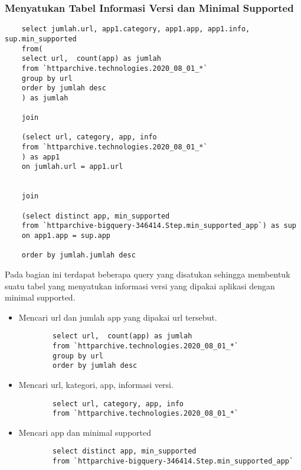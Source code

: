 \subsubsection{Menyatukan Tabel Informasi Versi dan Minimal Supported}
\begin{lstlisting}
	select jumlah.url, app1.category, app1.app, app1.info, sup.min_supported
	from(
	select url,  count(app) as jumlah
	from `httparchive.technologies.2020_08_01_*`
	group by url
	order by jumlah desc
	) as jumlah
	
	join 
	
	(select url, category, app, info
	from `httparchive.technologies.2020_08_01_*`
	) as app1
	on jumlah.url = app1.url
	
	
	join 
	
	(select distinct app, min_supported
	from `httparchive-bigquery-346414.Step.min_supported_app`) as sup
	on app1.app = sup.app
	
	order by jumlah.jumlah desc
\end{lstlisting}
Pada bagian ini terdapat beberapa query yang disatukan sehingga membentuk suatu tabel yang menyatukan informasi versi yang dipakai aplikasi dengan minimal supported.
\begin{itemize}
	\item Mencari url dan jumlah app yang dipakai url tersebut.
	\begin{lstlisting}
		select url,  count(app) as jumlah
		from `httparchive.technologies.2020_08_01_*`
		group by url
		order by jumlah desc
	\end{lstlisting}
	\item Mencari url, kategori, app, informasi versi.
	\begin{lstlisting}
		select url, category, app, info
		from `httparchive.technologies.2020_08_01_*`
	\end{lstlisting}
	\item Mencari app dan minimal supported
	\begin{lstlisting}
		select distinct app, min_supported
		from `httparchive-bigquery-346414.Step.min_supported_app`
	\end{lstlisting}
\end{itemize}
